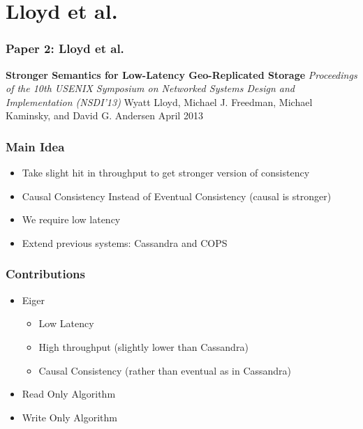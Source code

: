 \documentclass{beamer}
\begin{document}

\section{Lloyd et al.} 

\begin{frame}
\frametitle{Paper 2: Lloyd et al.}

\textbf{Stronger Semantics for Low-Latency Geo-Replicated Storage} \newline
\textit{Proceedings of the 10th USENIX Symposium on Networked Systems Design and Implementation (NSDI’13)} \newline
Wyatt Lloyd, Michael J. Freedman, Michael Kaminsky, and David G. Andersen \newline
April 2013 \newline

\end{frame}

\begin{frame}
\frametitle{Main Idea}
\begin{itemize}

\pause \item Take slight hit in throughput to get stronger version of consistency
\pause \item Causal Consistency Instead of Eventual Consistency (causal is stronger)
\pause \item We require low latency
\pause \item Extend previous systems: Cassandra and COPS

\end{itemize}  
\end{frame}

\begin{frame}
\frametitle{Contributions}
\begin{itemize}
\pause \item Eiger
	\begin{itemize}
		\item Low Latency
		\item High throughput (slightly lower than Cassandra)
		\item Causal Consistency (rather than eventual as in Cassandra)
	\end{itemize}
\pause \item Read Only Algorithm
\pause \item Write Only Algorithm
\end{itemize}  
\end{frame}
\end{document}
